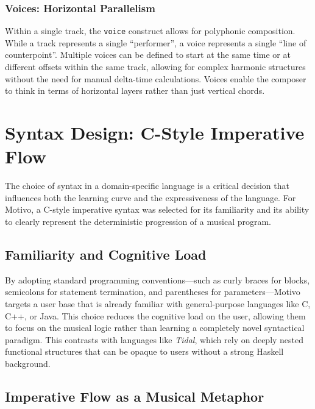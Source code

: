 \subsubsection{Voices: Horizontal Parallelism}
Within a single track, the \texttt{voice} construct allows for polyphonic composition.
While a track represents a single ``performer'', a voice represents a single ``line of counterpoint''.
Multiple voices can be defined to start at the same time or at different offsets within the same track, allowing for
complex harmonic structures without the need for manual delta-time calculations.
Voices enable the composer to think in terms of horizontal layers rather than just vertical chords.


\section{Syntax Design: C-Style Imperative Flow}\label{detail-sec:syntax-design}

The choice of syntax in a domain-specific language is a critical decision that influences both the learning curve and
the expressiveness of the language.
For Motivo, a C-style imperative syntax was selected for its familiarity and its ability to clearly represent
the deterministic progression of a musical program.

\subsection{Familiarity and Cognitive Load}\label{detail-subsec:familiarity-and-cognitive-load}

By adopting standard programming conventions---such as curly braces for blocks, semicolons for statement
termination, and
parentheses for parameters---Motivo targets a user base that is already familiar with general-purpose languages like C,
C++, or Java.
This choice reduces the cognitive load on the user, allowing them to focus on the musical logic rather than learning a
completely novel syntactical paradigm.
This contrasts with languages like \textit{Tidal}, which rely on deeply nested functional structures that can be opaque
to users without a strong Haskell background.

\subsection{Imperative Flow as a Musical Metaphor}\label{detail-subsec:imperative-flow-as-a-musical-metaphor}

